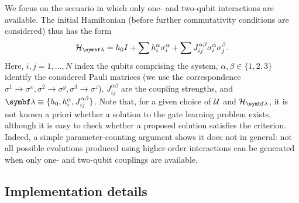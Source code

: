 We focus on the scenario in which only one- and two-qubit interactions are available. The initial Hamiltonian \ansatz (before further commutativity conditions are considered) thus has the form
\begin{equation}
    \calH_\bslambda = h_0 I + \sum h^\alpha_{i} \sigma_i^\alpha + \sum J_{ij}^{\alpha\beta} \sigma_i^\alpha \sigma_j^\beta.
    \label{eq:GL:hamiltonian_atmostpairwise}
\end{equation}
Here, $i, j=1,...,N$ index the qubits comprising the system, $\alpha, \beta\in\{1,2,3\}$ identify the considered Pauli matrices (we use the correspondence $\sigma^1\rightarrow\sigma^x, \sigma^2\rightarrow\sigma^y, \sigma^3\rightarrow\sigma^z$), $J_{ij}^{\alpha\beta}$ are the coupling strengths, and $\bslambda\equiv \{h_0, h^\alpha_{i}, J_{ij}^{\alpha\beta}\}$.
Note that, for a given choice of ${\mathcal{U}}$ and $\calH_\bslambda$, it is not known a priori whether a solution to the gate learning problem exists, although it is easy to check whether a proposed solution satisfies the criterion.
Indeed, a simple parameter-counting argument shows it does not in general: not all possible evolutions produced using higher-order interactions can be generated when only one- and two-qubit couplings are available.


\subsection{Implementation details}
\label{subsec:GL:implementation_details}

